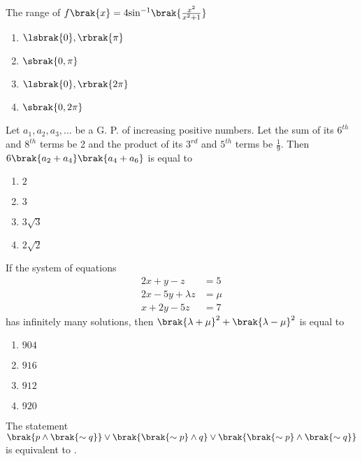 \item The range of $f\brak{x}=4{\sin}^{-1}\brak{\frac{x^2}{x^2+1}}$\hfill{}

\begin{multicols}{4}
\begin{enumerate}
\item $\lsbrak {0},\rbrak{\pi}$
\item $\sbrak{0,\pi}$
\item $\lsbrak{0},\rbrak{2\pi}$
\item $\sbrak{0,2\pi}$
\end{enumerate}
\end{multicols}

\item Let $a_1, a_2, a_3, \dots$ be a G. P. of increasing positive numbers. Let the sum of its $6^{th}$ and $8^{th}$ terms be 2 and the product of its $3^{rd}$ and $5^{th}$ terms be $\frac{1}{9}$. Then $6\brak{a_2 + a_4}\brak{ a_4 + a_6}$ is equal to\hfill{}

\begin{multicols}{4}
\begin{enumerate}
\item $2$
\item $3$
\item $3\sqrt{3}$
\item $2\sqrt{2}$
\end{enumerate}
\end{multicols}

\item If the system of equations
\begin{align*}
2x+y -z&=5\\
2x-5y+\lambda z&=\mu\\
x+2y-5z&=7
\end{align*}
has infinitely many solutions, then ${\brak{\lambda+\mu}}^2+{\brak{\lambda-\mu}}^2$ is equal to

\hfill{}

\begin{multicols}{4}
\begin{enumerate}
\item $904$
\item $916$
\item $912$
\item $920$
\end{enumerate}
\end{multicols}

\item The statement $\brak{p\land\brak{\sim q}}\lor\brak{\brak{\sim p}\land q}\lor\brak{\brak{\sim p}\land \brak{\sim q}}$ is equivalent to .

